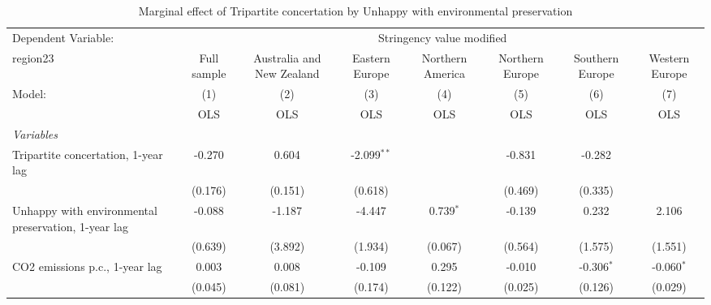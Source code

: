 
\begin{table}[htbp]
   \caption{Marginal effect of Tripartite concertation by Unhappy with environmental preservation}
   \centering
   \begin{tabular}{lccccccc}
      \toprule
      Dependent Variable: & \multicolumn{7}{c}{Stringency value modified}\\
      region23                                                                                  & Full sample   & Australia and New Zealand & Eastern Europe & Northern America & Northern Europe & Southern Europe & Western Europe \\   
      Model:                                                                                    & (1)           & (2)                       & (3)            & (4)              & (5)             & (6)             & (7)\\  
                                                                                                &  OLS          & OLS                       & OLS            & OLS              & OLS             & OLS             & OLS\\  
      \midrule
      \emph{Variables}\\
      Tripartite concertation, 1-year lag                                                       & -0.270        & 0.604                     & -2.099$^{**}$  &                  & -0.831          & -0.282          &   \\   
                                                                                                & (0.176)       & (0.151)                   & (0.618)        &                  & (0.469)         & (0.335)         &   \\   
      Unhappy with environmental preservation, 1-year lag                                       & -0.088        & -1.187                    & -4.447         & 0.739$^{*}$      & -0.139          & 0.232           & 2.106\\   
                                                                                                & (0.639)       & (3.892)                   & (1.934)        & (0.067)          & (0.564)         & (1.575)         & (1.551)\\   
      CO2 emissions p.c., 1-year lag                                                            & 0.003         & 0.008                     & -0.109         & 0.295            & -0.010          & -0.306$^{*}$    & -0.060$^{*}$\\   
                                                                                                & (0.045)       & (0.081)                   & (0.174)        & (0.122)          & (0.025)         & (0.126)         & (0.029)\\   

\end{tabular}
\end{table}
